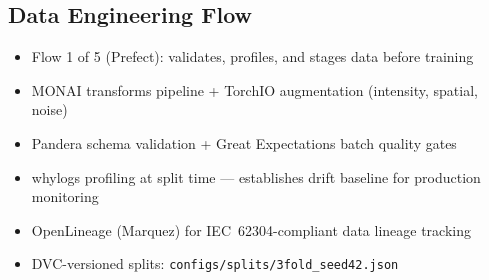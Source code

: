 
\subsection{Data Engineering Flow}
\begin{itemize}
  \item Flow 1 of 5 (Prefect): validates, profiles, and stages data before training
  \item MONAI transforms pipeline + TorchIO augmentation (intensity, spatial, noise)
  \item Pandera schema validation + Great Expectations batch quality gates
  \item whylogs profiling at split time --- establishes drift baseline for production monitoring
  \item OpenLineage (Marquez) for IEC~62304-compliant data lineage tracking
  \item DVC-versioned splits: \texttt{configs/splits/3fold\_seed42.json}
\end{itemize}

